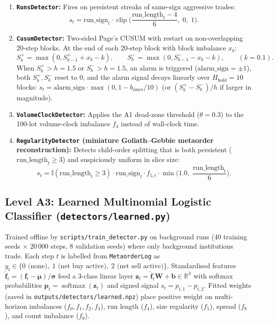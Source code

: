 \documentclass[11pt,a4paper]{article}
\newcommand{\code}[1]{\texttt{#1}}
\newcommand{\clip}{\operatorname{clip}}
\begin{document}
\begin{enumerate}[nosep]
\item \textbf{\code{RunsDetector}:} Fires on persistent streaks of same-sign aggressive trades:
  \begin{equation}
    s_t = \text{run\_sign}_t \cdot \clip\!\Big(\frac{\text{run\_length}_t - 4}{6},\; 0,\; 1\Big).
  \end{equation}
\item \textbf{\code{CusumDetector}:} Two-sided Page's CUSUM with restart on non-overlapping 20-step
  blocks. At the end of each 20-step block with block imbalance $x_b$:
  \begin{equation}
    S^+_b = \max(0, S^+_{b-1} + x_b - k), \qquad S^-_b = \max(0, S^-_{b-1} - x_b - k), \qquad (k = 0.1).
  \end{equation}
  When $S^+_b > h = 1.5$ or $S^-_b > h = 1.5$, an alarm is triggered ($\text{alarm\_sign} = \pm 1$), both
  $S^+_b, S^-_b$ reset to $0$, and the alarm signal decays linearly over $H_{\text{hold}} = 10$ blocks:
  $s_t = \text{alarm\_sign}\cdot\max(0, 1 - b_{\text{since}}/10)$ (or $(S^+_b - S^-_b)/h$ if larger in
  magnitude).
\item \textbf{\code{VolumeClockDetector}:} Applies the A1 dead-zone threshold ($\theta = 0.3$) to the
  100-lot volume-clock imbalance $f_3$ instead of wall-clock time.
\item \textbf{\code{RegularityDetector} (miniature Goliath--Gebbie metaorder reconstruction):} Detects
  child-order splitting that is both persistent ($\text{run\_length}_t \ge 3$) and suspiciously uniform
  in slice size:
  \begin{equation}
    s_t = \mathbb{I}(\text{run\_length}_t \ge 3)\cdot \text{run\_sign}_t \cdot f_{5,t} \cdot
    \min\!\Big(1.0,\; \frac{\text{run\_length}_t}{6}\Big).
  \end{equation}
\end{enumerate}

\subsection{Level A3: Learned Multinomial Logistic Classifier (\code{detectors/learned.py})}

Trained offline by \code{scripts/train\_detector.py} on background runs (40 training seeds $\times$
$20\,000$ steps, 8 validation seeds) where only background institutions trade. Each step $t$ is labelled
from \code{MetaorderLog} as $y_t \in \{0\text{ (none)},\; 1\text{ (net buy active)},\; 2\text{ (net sell
active)}\}$. Standardised features $\tilde{\mathbf{f}}_t = (\mathbf{f}_t - \boldsymbol{\mu})/\boldsymbol{\sigma}$
feed a 3-class linear layer $\mathbf{z}_t = \tilde{\mathbf{f}}_t \mathbf{W} + \mathbf{b} \in \mathbb{R}^3$
with softmax probabilities $\mathbf{p}_t = \operatorname{softmax}(\mathbf{z}_t)$ and signed signal
$s_t = p_{t,1} - p_{t,2}$. Fitted weights (saved in \code{outputs/detectors/learned.npz}) place positive
weight on multi-horizon imbalances ($f_0, f_1, f_2, f_3$), run length ($f_4$), size regularity ($f_5$),
spread ($f_8$), and count imbalance ($f_9$).
\end{document}
